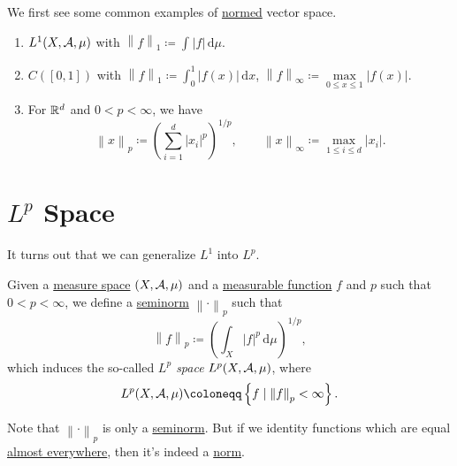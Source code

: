 \begin{eg}
	We first see some common examples of \hyperref[def:norm]{normed} vector space.
	\begin{enumerate}
		\item \(L^1(X, \mathcal{\MakeUppercase{a}}  , \mu )\) with \(\left\lVert f\right\rVert _1 \coloneqq \int_{}^{} \left\vert f \right\vert  \,\mathrm{d}\mu  \).
		\item \(C([0, 1])\) with \(\left\lVert f\right\rVert _1 \coloneqq \int_{0}^{1} \left\vert f(x) \right\vert  \,\mathrm{d}x \), \(\left\lVert f\right\rVert _\infty \coloneqq \mathop{\max}\limits_{0\leq x\leq 1}\left\vert f(x) \right\vert \).
		\item For \(\mathbb{\MakeUppercase{r}} ^d\) and \(0 < p < \infty \), we have
		      \[
			      \left\lVert x\right\rVert _p \coloneqq \left(\sum\limits_{i=1}^{d} \left\vert x_{i}  \right\vert^p \right)^{1/p},\qquad \left\lVert x\right\rVert _\infty \coloneqq \mathop{\max} _{1\leq i\leq d}\left\vert x_{i}  \right\vert.
		      \]
	\end{enumerate}
\end{eg}

\section{\(L^{p} \) Space}
It turns out that we can generalize \hyperref[def:L1-space]{\(L^1\)} into \(L^p\).
\begin{definition}[\(L^p\) space]\label{def:L-p-space}
	Given a \hyperref[def:measure-space]{measure space} \((X, \mathcal{\MakeUppercase{a}} , \mu )\) and a \hyperref[def:measurable-function]{measurable function} \(f\) and \(p\) such that
	\(0 < p < \infty \), we define a \hyperref[def:seminorm]{seminorm} \(\left\lVert \cdot\right\rVert _p\) such that
	\[
		\left\lVert f\right\rVert _p \coloneqq \left(\int _X \left\vert f \right\vert ^p \,\mathrm{d} \mu \right)^{1/p},
	\]
	which induces the so-called \emph{\(L^p\) space} \(L^p(X, \mathcal{\MakeUppercase{a}} , \mu )\), where
	\[
		L^p(X, \mathcal{\MakeUppercase{a}} , \mu ) \coloneqq \left\{f\mid \left\lVert f\right\rVert _p < \infty \right\}.
	\]
\end{definition}
\begin{remark}
	Note that \(\left\lVert \cdot\right\rVert _p\) is only a \hyperref[def:seminorm]{seminorm}. But if we identity functions which are equal \hyperref[def:mu-almost-everywhere]{almost everywhere},
	then it's indeed a \hyperref[def:norm]{norm}.
\end{remark}

